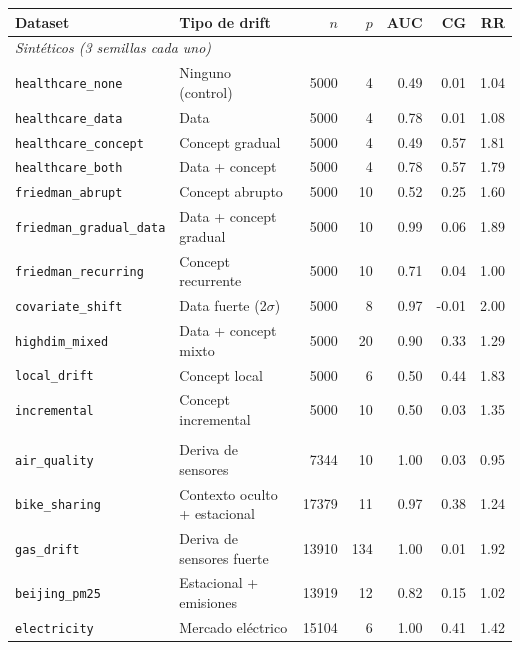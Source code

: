 \begin{tabularx}{\textwidth}{l X r r r r r}
\toprule
Dataset & Tipo de drift & {$n$} & {$p$} & {AUC} & {CG} & {RR} \\
\midrule
\multicolumn{7}{l}{\textit{Sintéticos (3 semillas cada uno)}} \\
\texttt{healthcare\_none} & Ninguno (control) & 5000 & 4 & 0.49 & 0.01 & 1.04 \\
\texttt{healthcare\_data} & Data & 5000 & 4 & 0.78 & 0.01 & 1.08 \\
\texttt{healthcare\_concept} & Concept gradual & 5000 & 4 & 0.49 & 0.57 & 1.81 \\
\texttt{healthcare\_both} & Data + concept & 5000 & 4 & 0.78 & 0.57 & 1.79 \\
\texttt{friedman\_abrupt} & Concept abrupto & 5000 & 10 & 0.52 & 0.25 & 1.60 \\
\texttt{friedman\_gradual\_data} & Data + concept gradual & 5000 & 10 & 0.99 & 0.06 & 1.89 \\
\texttt{friedman\_recurring} & Concept recurrente & 5000 & 10 & 0.71 & 0.04 & 1.00 \\
\texttt{covariate\_shift} & Data fuerte (2$\sigma$) & 5000 & 8 & 0.97 & -0.01 & 2.00 \\
\texttt{highdim\_mixed} & Data + concept mixto & 5000 & 20 & 0.90 & 0.33 & 1.29 \\
\texttt{local\_drift} & Concept local & 5000 & 6 & 0.50 & 0.44 & 1.83 \\
\texttt{incremental} & Concept incremental & 5000 & 10 & 0.50 & 0.03 & 1.35 \\
\addlinespace
\multicolumn{7}{l}{\textit{Reales}} \\
\texttt{air\_quality} & Deriva de sensores & 7344 & 10 & 1.00 & 0.03 & 0.95 \\
\texttt{bike\_sharing} & Contexto oculto + estacional & 17379 & 11 & 0.97 & 0.38 & 1.24 \\
\texttt{gas\_drift} & Deriva de sensores fuerte & 13910 & 134 & 1.00 & 0.01 & 1.92 \\
\texttt{beijing\_pm25} & Estacional + emisiones & 13919 & 12 & 0.82 & 0.15 & 1.02 \\
\texttt{electricity} & Mercado eléctrico & 15104 & 6 & 1.00 & 0.41 & 1.42 \\
\bottomrule
\end{tabularx}
